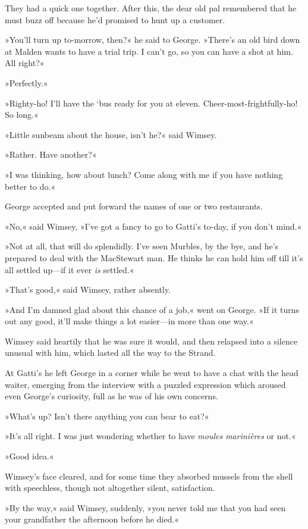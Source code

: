 They had a quick one together. After this, the dear old pal remembered that he must buzz off because he'd promised to hunt up a customer.

»You'll turn up to-morrow, then?« he said to George. »There's an old bird down at Malden wants to have a trial trip. I can't go, so you can have a shot at him. All right?«

»Perfectly.«

»Righty-ho! I'll have the `bus ready for you at eleven. Cheer-most-frightfully-ho! So long.«

»Little sunbeam about the house, isn't he?« said Wimsey.

»Rather. Have another?«

»I was thinking, how about lunch? Come along with me if you have nothing better to do.«

George accepted and put forward the names of one or two restaurants.

»No,« said Wimsey, »I've got a fancy to go to Gatti's to-day, if you don't mind.«

»Not at all, that will do splendidly. I've seen Murbles, by the bye, and he's prepared to deal with the MacStewart man. He thinks he can hold him off till it's all settled up—if it ever \textit{is} settled.«

»That's good,« said Wimsey, rather absently.

»And I'm damned glad about this chance of a job,« went on George. »If it turns out any good, it'll make things a lot easier—in more than one way.«

Wimsey said heartily that he was sure it would, and then relapsed into a silence unusual with him, which lasted all the way to the Strand.

At Gatti's he left George in a corner while he went to have a chat with the head waiter, emerging from the interview with a puzzled expression which aroused even George's curiosity, full as he was of his own concerns.

»What's up? Isn't there anything you can bear to eat?«

»It's all right. I was just wondering whether to have \textit{moules marinières} or not.«

»Good idea.«

Wimsey's face cleared, and for some time they absorbed mussels from the shell with speechless, though not altogether silent, satisfaction.

»By the way,« said Wimsey, suddenly, »you never told me that you had seen your grandfather the afternoon before he died.«

